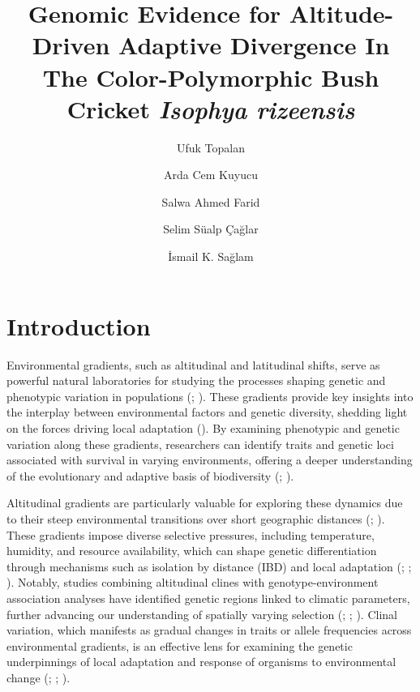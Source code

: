 \documentclass[9pt,a4paper,twoside]{rho-class/rho}
\title{Genomic Evidence for Altitude-Driven Adaptive Divergence In The Color-Polymorphic Bush Cricket \textit{Isophya rizeensis}}
\author[1]{Ufuk Topalan}
\author[2]{Arda Cem Kuyucu}
\author[1]{Salwa Ahmed Farid}
\author[2]{Selim Süalp Çağlar}
\author[1,$\star$]{İsmail K. Sağlam}
\affil[1]{Department of Molecular Biology and Genetics, Koç University, Istanbul, Türkiye}
\affil[2]{Department of Biology, Hacettepe University, Ankara, Türkiye}
\affil[$\star$]{corresponding author}
\begin{document}
	
    \maketitle
    \thispagestyle{firststyle}
    \linenumbers


\section{Introduction}

    Environmental gradients, such as altitudinal and latitudinal shifts, serve as powerful natural laboratories for studying the processes shaping genetic and phenotypic variation in populations (\cite{Wogan2018}; \cite{Kelly2019}). These gradients provide key insights into the interplay between environmental factors and genetic diversity, shedding light on the forces driving local adaptation (\cite{Muir2014}). By examining phenotypic and genetic variation along these gradients, researchers can identify traits and genetic loci associated with survival in varying environments, offering a deeper understanding of the evolutionary and adaptive basis of biodiversity (\cite{Merilä2014}; \cite{Waldvogel2020}).
    
    Altitudinal gradients are particularly valuable for exploring these dynamics due to their steep environmental transitions over short geographic distances (\cite{Chown2003}; \cite{Flatt2016}). These gradients impose diverse selective pressures, including temperature, humidity, and resource availability, which can shape genetic differentiation through mechanisms such as isolation by distance (IBD) and local adaptation (\cite{Sexton2014}; \cite{Stankowski2017}; \cite{Bradburd2019}). Notably, studies combining altitudinal clines with genotype-environment association analyses have identified genetic regions linked to climatic parameters, further advancing our understanding of spatially varying selection (\cite{Hancock2011}; \cite{Slatyer2014}; \cite{Pluess2016}). Clinal variation, which manifests as gradual changes in traits or allele frequencies across environmental gradients, is an effective lens for examining the genetic underpinnings of local adaptation and response of organisms to environmental change (\cite{Mayekar2022}; \cite{Tyrmi2020}; \cite{Soliani2020}).
    
\end{document}
